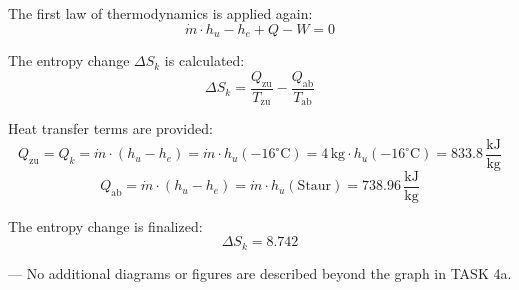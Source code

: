 The first law of thermodynamics is applied again:  
\[
\dot{m} \cdot h_u - h_e + Q - W = 0
\]  

The entropy change \( \Delta S_k \) is calculated:  
\[
\Delta S_k = \frac{Q_{\text{zu}}}{T_{\text{zu}}} - \frac{Q_{\text{ab}}}{T_{\text{ab}}}
\]  

Heat transfer terms are provided:  
\[
Q_{\text{zu}} = Q_k = \dot{m} \cdot (h_u - h_e) = \dot{m} \cdot h_u(-16^\circ\text{C}) = 4 \, \text{kg} \cdot h_u(-16^\circ\text{C}) = 833.8 \, \frac{\text{kJ}}{\text{kg}}
\]  
\[
Q_{\text{ab}} = \dot{m} \cdot (h_u - h_e) = \dot{m} \cdot h_u(\text{Staur}) = 738.96 \, \frac{\text{kJ}}{\text{kg}}
\]  

The entropy change is finalized:  
\[
\Delta S_k = 8.742
\]  

---  
No additional diagrams or figures are described beyond the graph in TASK 4a.